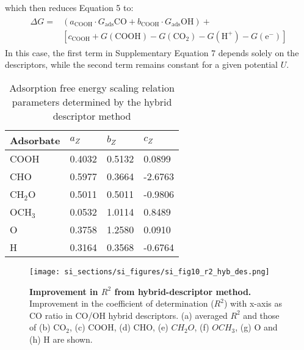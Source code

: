 which then reduces Equation 5 to:
\begin{align}
  \begin{split}
    \Delta G = &(a_{\text{COOH}} \cdot G_{\text{ads}}{\mathrm{CO}} + b_{\text{COOH}} \cdot G_{\text{ads}}{\mathrm{OH}}) + \\
    &[c_{\text{COOH}} + G(\mathrm{COOH}) - G(\mathrm{CO}_2) - G(\mathrm{H}^+) - G(\mathrm{e}^-)]
  \end{split}
\end{align}
In this case, the first term in Supplementary Equation 7 depends solely on the descriptors, while the second term remains constant for a given potential $U$.


\begin{table}[h]
  \centering
  {\fontsize{10}{12}\selectfont
  \begin{tabular}{*{4}{l}}
    \hline
    \textbf{Adsorbate} & \textbf{$a_Z$}  & \textbf{$b_Z$}  & \textbf{$c_Z$}   \\
    \hline
    COOH      & 0.4032 & 0.5132 &  0.0899  \\
    CHO       & 0.5977 & 0.3664 & -2.6763  \\
    CH$_2$O   & 0.5011 & 0.5011 & -0.9806  \\
    OCH$_3$   & 0.0532 & 1.0114 &  0.8489  \\
    O         & 0.3758 & 1.2580 &  0.0910  \\
    H         & 0.3164 & 0.3568 & -0.6764  \\
    \hline
  \end{tabular}
  }
  \caption{Adsorption free energy scaling relation parameters determined by the hybrid descriptor method}
  \label{si_table13:scaling_params}
\end{table}


\begin{figure}
  \centering
  \texttt{[image: si\_sections/si\_figures/si\_fig10\_r2\_hyb\_des.png]}
  \caption{\textbf{Improvement in $R^2$ from hybrid-descriptor method.}
  Improvement in the coefficient of determination ($R^2$) with x-axis as CO ratio in CO/OH hybrid descriptors.
  (a) averaged $R^2$ and those of (b) CO$_2$, (c) COOH, (d) CHO, (e) $CH_2O$, (f) $OCH_3$, (g) O and (h) H are shown.}
  \label{si_fig10:r2_hyb_des}
\end{figure}


